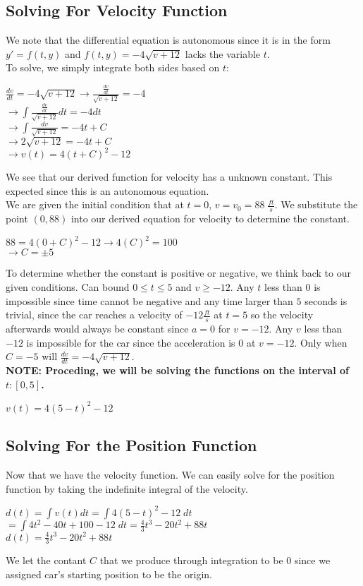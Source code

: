 \documentclass{article}
\begin{document}
		\subsection{Solving For Velocity Function}
			We note that the differential equation is autonomous since it is in the form $y' = f(t,y)$ and $f(t,y) = -4\sqrt{v+12}$ lacks the variable $t$.\\
			To solve, we simply integrate both sides based on $t$:
			\begin{center}
				$\frac{dv}{dt} = -4\sqrt{v+12} \rightarrow \frac{\frac{dv}{dt}}{\sqrt{v+12}} = -4$\\
				$\rightarrow \int \frac{\frac{dv}{dt}}{\sqrt{v+12}}dt = -4dt$ \\
				$\rightarrow \int \frac{dv}{\sqrt{v+12}} = -4t+C$\\
				$\rightarrow 2\sqrt{v+12} = -4t+C$\\
				$ \rightarrow v(t) = 4(t+C)^2-12$
			\end{center}
			We see that our derived function for velocity has a unknown constant. This expected since this is an autonomous equation.\\
			We are given the initial condition that at $t=0$, $v = v_0 = 88\;\frac{ft}{s}$. We substitute the point $(0,88)$ into our derived equation for velocity to determine the constant.
			\begin{center}
				$88 = 4(0+C)^2-12 \rightarrow 4(C)^2 = 100$\\
				$\rightarrow C = \pm 5$
			\end{center}
			To determine whether the constant is positive or negative, we think back to our given conditions. Can bound $0\le t\le 5$ and $v \ge -12$. Any $t$ less than $0$ is impossible since time cannot be negative and any time larger than $5$ seconds is trivial, since the car reaches a velocity of $-12\frac{ft}{s}$ at $t=5$ so the velocity afterwards would always be constant since $a=0$ for $v=-12$. Any $v$ less than $-12$ is impossible for the car since the acceleration is $0$ at $v=-12$. Only when $C = -5$ will $\frac{dv}{dt} = -4\sqrt{v+12}$.
			\\
			\textbf{NOTE: Proceding, we will be solving the functions on the interval of $t:[0,5]$.}
			\begin{center}
				$v(t)=4(5-t)^2 - 12$
			\end{center}
		\subsection{Solving For the Position Function}
			Now that we have the velocity function. We can easily solve for the position function by taking the indefinite integral of the velocity.
			\begin{center}
				$d(t) = \int v(t)dt = \int 4(5-t)^2 - 12 \; dt$ \\
				$=\int 4t^2-40t+100 - 12\;dt = \frac{4}{3}t^3-20t^2+88t$ \\
				$d(t) = \frac{4}{3}t^3-20t^2+88t$
			\end{center}
			We let the contant $C$ that we produce through integration to be $0$ since we assigned car's starting position to be the origin.
\end{document}
